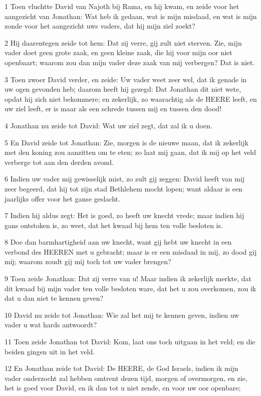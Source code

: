 \par 1 Toen vluchtte David van Najoth bij Rama, en hij kwam, en zeide voor het aangezicht van Jonathan: Wat heb ik gedaan, wat is mijn misdaad, en wat is mijn zonde voor het aangezicht uws vaders, dat hij mijn ziel zoekt?
\par 2 Hij daarentegen zeide tot hem: Dat zij verre, gij zult niet sterven. Zie, mijn vader doet geen grote zaak, en geen kleine zaak, die hij voor mijn oor niet openbaart; waarom zou dan mijn vader deze zaak van mij verbergen? Dat is niet.
\par 3 Toen zwoer David verder, en zeide: Uw vader weet zeer wel, dat ik genade in uw ogen gevonden heb; daarom heeft hij gezegd: Dat Jonathan dit niet wete, opdat hij zich niet bekommere; en zekerlijk, zo waarachtig als de HEERE leeft, en uw ziel leeft, er is maar als een schrede tussen mij en tussen den dood!
\par 4 Jonathan nu zeide tot David: Wat uw ziel zegt, dat zal ik u doen.
\par 5 En David zeide tot Jonathan: Zie, morgen is de nieuwe maan, dat ik zekerlijk met den koning zou aanzitten om te eten; zo laat mij gaan, dat ik mij op het veld verberge tot aan den derden avond.
\par 6 Indien uw vader mij gewisselijk mist, zo zult gij zeggen: David heeft van mij zeer begeerd, dat hij tot zijn stad Bethlehem mocht lopen; want aldaar is een jaarlijks offer voor het ganse geslacht.
\par 7 Indien hij aldus zegt: Het is goed, zo heeft uw knecht vrede; maar indien hij gans ontstoken is, zo weet, dat het kwaad bij hem ten volle besloten is.
\par 8 Doe dan barmhartigheid aan uw knecht, want gij hebt uw knecht in een verbond des HEEREN met u gebracht; maar is er een misdaad in mij, zo dood gij mij; waarom zoudt gij mij toch tot uw vader brengen?
\par 9 Toen zeide Jonathan: Dat zij verre van u! Maar indien ik zekerlijk merkte, dat dit kwaad bij mijn vader ten volle besloten ware, dat het u zou overkomen, zou ik dat u dan niet te kennen geven?
\par 10 David nu zeide tot Jonathan: Wie zal het mij te kennen geven, indien uw vader u wat hards antwoordt?
\par 11 Toen zeide Jonathan tot David: Kom, laat ons toch uitgaan in het veld; en die beiden gingen uit in het veld.
\par 12 En Jonathan zeide tot David: De HEERE, de God Israels, indien ik mijn vader onderzocht zal hebben omtrent dezen tijd, morgen of overmorgen, en zie, het is goed voor David, en ik dan tot u niet zende, en voor uw oor openbare;
